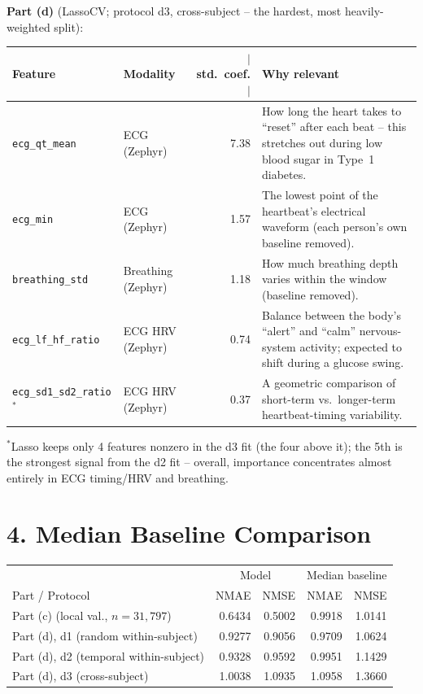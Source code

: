 \documentclass[10pt]{article}
\begin{document}
\textbf{Part (d)} (LassoCV; protocol d3, cross-subject -- the hardest, most heavily-weighted
split):
\begin{center}
\small
\begin{tabular}{llrp{5.7cm}}
\toprule
Feature & Modality & $|$std.\ coef.$|$ & Why relevant \\
\midrule
\texttt{ecg\_qt\_mean} & ECG (Zephyr) & 7.38 & How long the heart takes to ``reset'' after each beat -- this stretches out during low blood sugar in Type~1 diabetes. \\
\texttt{ecg\_min} & ECG (Zephyr) & 1.57 & The lowest point of the heartbeat's electrical waveform (each person's own baseline removed). \\
\texttt{breathing\_std} & Breathing (Zephyr) & 1.18 & How much breathing depth varies within the window (baseline removed). \\
\texttt{ecg\_lf\_hf\_ratio} & ECG HRV (Zephyr) & 0.74 & Balance between the body's ``alert'' and ``calm'' nervous-system activity; expected to shift during a glucose swing. \\
\texttt{ecg\_sd1\_sd2\_ratio}$^{*}$ & ECG HRV (Zephyr) & 0.37 & A geometric comparison of short-term vs.\ longer-term heartbeat-timing variability. \\
\bottomrule
\end{tabular}
\end{center}
{\footnotesize $^{*}$Lasso keeps only 4 features nonzero in the d3 fit (the four above it); the 5th
is the strongest signal from the d2 fit -- overall, importance concentrates almost entirely in
ECG timing/HRV and breathing.}

\section*{4. Median Baseline Comparison}

\begin{center}
\small
\begin{tabular}{lrrrr}
\toprule
& \multicolumn{2}{c}{Model} & \multicolumn{2}{c}{Median baseline} \\
Part / Protocol & NMAE & NMSE & NMAE & NMSE \\
\midrule
Part (c) (local val., $n{=}31{,}797$)      & 0.6434 & 0.5002 & 0.9918 & 1.0141 \\
Part (d), d1 (random within-subject)       & 0.9277 & 0.9056 & 0.9709 & 1.0624 \\
Part (d), d2 (temporal within-subject)     & 0.9328 & 0.9592 & 0.9951 & 1.1429 \\
Part (d), d3 (cross-subject)               & 1.0038 & 1.0935 & 1.0958 & 1.3660 \\
\bottomrule
\end{tabular}
\end{center}
\end{document}
